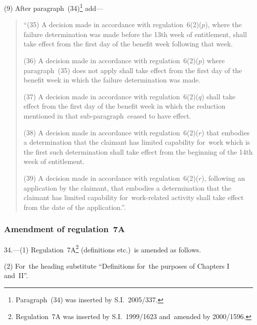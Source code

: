\documentclass[12pt,a4paper]{article}
\begin{document}
(9) After paragraph~(34)\footnote{Paragraph~(34) was inserted by S.I.~2005/337.} add—
\begin{quotation}
“(35) A decision made in accordance with regulation~6(2)($p$), where the failure determination was made before the 13th week of entitlement, shall take effect from the first day of the benefit week following that week.

(36) A decision made in accordance with regulation~6(2)($p$)  where paragraph~(35) does not apply shall take effect from the first day of the benefit week in which the failure determination was made.

(37) A decision made in accordance with regulation~6(2)($q$)  shall take effect from the first day of the benefit week in which the reduction mentioned in that sub-paragraph~ceased to have effect.

(38) A decision made in accordance with regulation~6(2)($r$)  that embodies a determination that the claimant has limited capability for~work which is the first such determination shall take effect from the beginning of the 14th week of entitlement.

(39) A decision made in accordance with regulation~6(2)($r$), following an application by the claimant, that embodies a determination that the claimant has limited capability for~work-related activity shall take effect from the date of the application.”.
\end{quotation}

\subsubsection[34. Amendment of regulation~7A]{Amendment of regulation~7A}

34.---(1)  Regulation~7A\footnote{Regulation~7A was inserted by S.I.~1999/1623 and~amended by 2000/1596.} (definitions etc.)\ is amended as follows.

(2) For~the heading substitute “Definitions for~the purposes of Chapters I and~II”.
\end{document}
